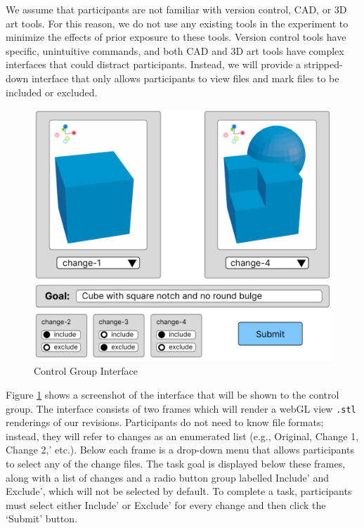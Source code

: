 \documentclass[sigconf,authorversion,nonacm]{acmart}
\begin{document}
We assume that participants are not familiar with version control, CAD, or 3D art tools.
For this reason, we do not use any existing tools in the experiment to minimize the effects of prior exposure to these tools.
Version control tools have specific, unintuitive commands, and both CAD and 3D art tools have complex interfaces that could distract participants.
Instead, we will provide a stripped-down interface that only allows participants to view files and mark files to be included or excluded.


\begin{figure}[h]
	\includegraphics[width=\linewidth]{controlgroup.png}
	\caption{Control Group Interface}
	\label{fig:controlgroup}
\end{figure}

Figure \ref{fig:controlgroup} shows a screenshot of the interface that will be shown to the control group.
The interface consists of two frames which will render a webGL view \texttt{.stl} renderings of our revisions.
Participants do not need to know file formats; instead, they will refer to changes as an enumerated list (e.g., Original, Change 1, Change 2,' etc.).
Below each frame is a drop-down menu that allows participants to select any of the change files.
The task goal is displayed below these frames, along with a list of changes and a radio button group labelled Include' and Exclude', which will not be selected by default.
To complete a task, participants must select either Include' or Exclude' for every change and then click the `Submit' button.
\end{document}
